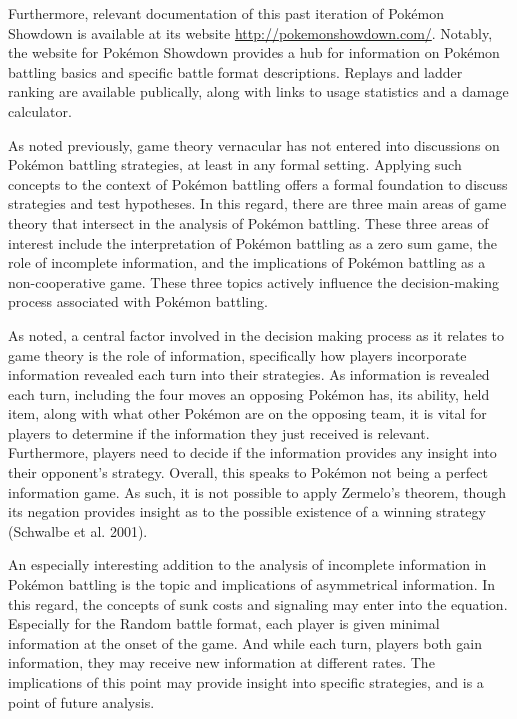 \documentclass[12pt,twoside]{reedthesis}
\begin{document}
  Furthermore, relevant documentation of this past iteration of Pokémon
  Showdown is available at its website \url{http://pokemonshowdown.com/}.
  Notably, the website for Pokémon Showdown provides a hub for information
  on Pokémon battling basics and specific battle format descriptions.
  Replays and ladder ranking are available publically, along with links to
  usage statistics and a damage calculator.
  
  As noted previously, game theory vernacular has not entered into
  discussions on Pokémon battling strategies, at least in any formal
  setting. Applying such concepts to the context of Pokémon battling
  offers a formal foundation to discuss strategies and test hypotheses. In
  this regard, there are three main areas of game theory that intersect in
  the analysis of Pokémon battling. These three areas of interest include
  the interpretation of Pokémon battling as a zero sum game, the role of
  incomplete information, and the implications of Pokémon battling as a
  non-cooperative game. These three topics actively influence the
  decision-making process associated with Pokémon battling.
  
  As noted, a central factor involved in the decision making process as it
  relates to game theory is the role of information, specifically how
  players incorporate information revealed each turn into their
  strategies. As information is revealed each turn, including the four
  moves an opposing Pokémon has, its ability, held item, along with what
  other Pokémon are on the opposing team, it is vital for players to
  determine if the information they just received is relevant.
  Furthermore, players need to decide if the information provides any
  insight into their opponent's strategy. Overall, this speaks to Pokémon
  not being a perfect information game. As such, it is not possible to
  apply Zermelo's theorem, though its negation provides insight as to the
  possible existence of a winning strategy (Schwalbe et al. 2001).
  
  An especially interesting addition to the analysis of incomplete
  information in Pokémon battling is the topic and implications of
  asymmetrical information. In this regard, the concepts of sunk costs and
  signaling may enter into the equation. Especially for the Random battle
  format, each player is given minimal information at the onset of the
  game. And while each turn, players both gain information, they may
  receive new information at different rates. The implications of this
  point may provide insight into specific strategies, and is a point of
  future analysis.
  
\end{document}

